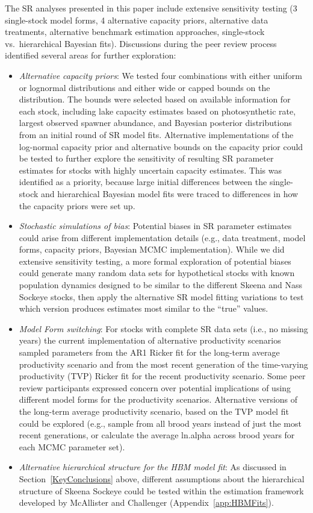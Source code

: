 \documentclass[french,11pt]{book}
\begin{document}
The SR analyses presented in this paper include extensive sensitivity testing (3 single-stock model forms, 4 alternative capacity priors, alternative data treatments, alternative benchmark estimation approaches, single-stock vs.~hierarchical Bayesian fits). Discussions during the peer review process identified several areas for further exploration:
\begin{itemize}

\item
  \emph{Alternative capacity priors}: We tested four combinations with either uniform or lognormal distributions and either wide or capped bounds on the distribution. The bounds were selected based on available information for each stock, including lake capacity estimates based on photosynthetic rate, largest observed spawner abundance, and Bayesian posterior distributions from an initial round of SR model fits. Alternative implementations of the log-normal capacity prior and alternative bounds on the capacity prior could be tested to further explore the sensitivity of resulting SR parameter estimates for stocks with highly uncertain capacity estimates. This was identified as a priority, because large initial differences between the single-stock and hierarchical Bayesian model fits were traced to differences in how the capacity priors were set up.
\item
  \emph{Stochastic simulations of bias}: Potential biases in SR parameter estimates could arise from different implementation details (e.g., data treatment, model forms, capacity priors, Bayesian MCMC implementation). While we did extensive sensitivity testing, a more formal exploration of potential biases could generate many random data sets for hypothetical stocks with known population dynamics designed to be similar to the different Skeena and Nass Sockeye stocks, then apply the alternative SR model fitting variations to test which version produces estimates most similar to the ``true'' values.
\item
  \emph{Model Form switching}: For stocks with complete SR data sets (i.e., no missing years) the current implementation of alternative productivity scenarios sampled parameters from the AR1 Ricker fit for the long-term average productivity scenario and from the most recent generation of the time-varying productivity (TVP) Ricker fit for the recent productivity scenario. Some peer review participants expressed concern over potential implications of using different model forms for the productivity scenarios. Alternative versions of the long-term average productivity scenario, based on the TVP model fit could be explored (e.g., sample from all brood years instead of just the most recent generations, or calculate the average ln.alpha across brood years for each MCMC parameter set).
\item
  \emph{Alternative hierarchical structure for the HBM model fit}: As discussed in Section~\ref{KeyConclusions} above, different assumptions about the hierarchical structure of Skeena Sockeye could be tested within the estimation framework developed by McAllister and Challenger (Appendix~\ref{app:HBMFits}).
\end{itemize}
\end{document}
